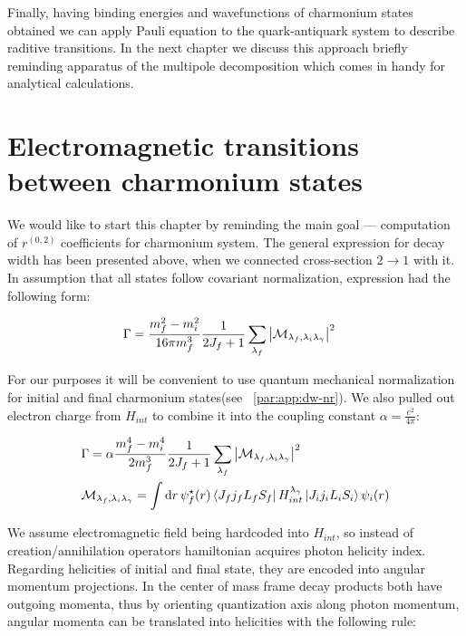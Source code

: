 Finally, having binding energies and wavefunctions of charmonium states obtained we can apply Pauli equation to the quark-antiquark system to describe raditive transitions. In the next chapter we discuss this approach briefly reminding apparatus of the multipole decomposition which comes in handy for analytical calculations.

\section{Electromagnetic transitions between charmonium states}
We would like to start this chapter by reminding the main goal --- computation of $r^{(0,2)}$ coefficients for charmonium system. The general expression for decay width has been presented above, when we connected cross-section $2 \rightarrow 1$ with it. In assumption that all states follow covariant normalization, expression had the following form:

\begin{align}
    &\Gamma = \frac{m_f^2 - m_i^2}{16 \pi m_f^3} \frac{1}{2J_f + 1} \sum_{\lambda_f} \abs{\mathcal{M}_{\lambda_f, \lambda_i \lambda_\gamma}}^2
\end{align}

For our purposes it will be convenient to use quantum mechanical normalization for initial and final charmonium states(see ~\cref{par:app:dw-nr}). We also pulled out electron charge from $H_{int}$ to combine it into the coupling constant $\alpha = \frac{e^2}{4 \pi}$: 

\begin{align}
    &\Gamma = \alpha \frac{m_f^4 - m_i^4}{2 m_f^3} \frac{1}{2J_f + 1} \sum_{\lambda_f} \abs{\mathcal{M}_{\lambda_f, \lambda_i \lambda_\gamma}}^2 \label{eq:dw-nr} \\
    &\mathcal{M}_{\lambda_f, \lambda_i \lambda_\gamma} = \int \dd{r} \psi_f^\star(r) \bra{J_f j_f L_f S_f} H_{int}^{\lambda_\gamma} \ket{J_i j_i L_i S_i} \psi_i(r) \label{eq:mel-nr}
\end{align}

We assume electromagnetic field being hardcoded into $H_{int}$, so instead of creation/annihilation operators hamiltonian acquires photon helicity index. Regarding helicities of initial and final state, they are encoded into angular momentum projections. In the center of mass frame decay products both have outgoing momenta, thus by orienting quantization axis along photon momentum, angular momenta can be translated into helicities with the following rule:

